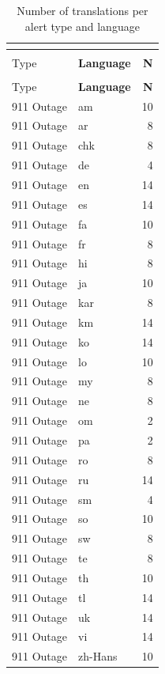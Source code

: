 \begin{longtable}{p{3cm} p{3cm} r}
\caption{Number of translations per alert type and language} \\
\label{tab:translations_full} \\
\hline
\textbf{Alert\\Type} & \textbf{Language} & \textbf{N} \\
\hline
\endfirsthead

\hline
\textbf{Alert\\Type} & \textbf{Language} & \textbf{N} \\
\hline
\endhead

\hline
\endfoot

\hline
\endlastfoot

911 Outage & am & 10 \\
911 Outage & ar & 8 \\
911 Outage & chk & 8 \\
911 Outage & de & 4 \\
911 Outage & en & 14 \\
911 Outage & es & 14 \\
911 Outage & fa & 10 \\
911 Outage & fr & 8 \\
911 Outage & hi & 8 \\
911 Outage & ja & 10 \\
911 Outage & kar & 8 \\
911 Outage & km & 14 \\
911 Outage & ko & 14 \\
911 Outage & lo & 10 \\
911 Outage & my & 8 \\
911 Outage & ne & 8 \\
911 Outage & om & 2 \\
911 Outage & pa & 2 \\
911 Outage & ro & 8 \\
911 Outage & ru & 14 \\
911 Outage & sm & 4 \\
911 Outage & so & 10 \\
911 Outage & sw & 8 \\
911 Outage & te & 8 \\
911 Outage & th & 10 \\
911 Outage & tl & 14 \\
911 Outage & uk & 14 \\
911 Outage & vi & 14 \\
911 Outage & zh-Hans & 10 \\

\end{longtable}
